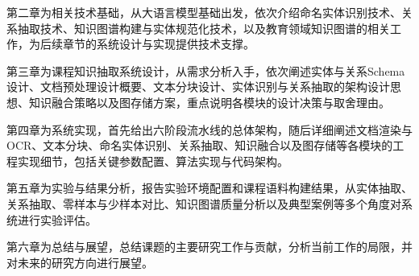 第二章为相关技术基础，从大语言模型基础出发，依次介绍命名实体识别技术、关系抽取技术、知识图谱构建与实体规范化技术，以及教育领域知识图谱的相关工作，为后续章节的系统设计与实现提供技术支撑。

第三章为课程知识抽取系统设计，从需求分析入手，依次阐述实体与关系Schema设计、文档预处理设计概要、文本分块设计、实体识别与关系抽取的架构设计思想、知识融合策略以及图存储方案，重点说明各模块的设计决策与取舍理由。

第四章为系统实现，首先给出六阶段流水线的总体架构，随后详细阐述文档渲染与OCR、文本分块、命名实体识别、关系抽取、知识融合以及图存储等各模块的工程实现细节，包括关键参数配置、算法实现与代码架构。

第五章为实验与结果分析，报告实验环境配置和课程语料构建结果，从实体抽取、关系抽取、零样本与少样本对比、知识图谱质量分析以及典型案例等多个角度对系统进行实验评估。

第六章为总结与展望，总结课题的主要研究工作与贡献，分析当前工作的局限，并对未来的研究方向进行展望。
